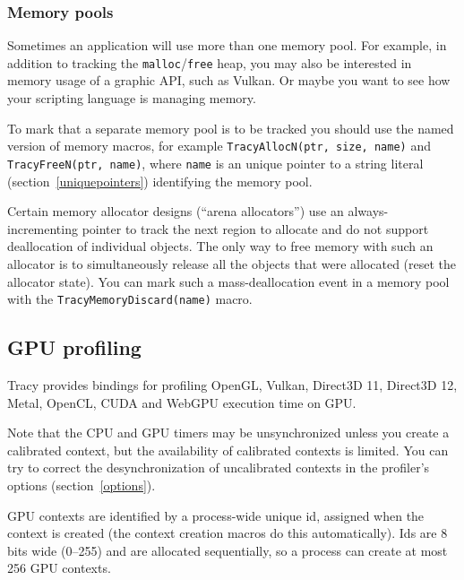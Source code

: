 \documentclass[hidelinks,titlepage,a4paper,twoside]{article}
\begin{document}
\subsubsection{Memory pools}
\label{memorypools}

Sometimes an application will use more than one memory pool. For example, in addition to tracking the \texttt{malloc}/\texttt{free} heap, you may also be interested in memory usage of a graphic API, such as Vulkan. Or maybe you want to see how your scripting language is managing memory.

To mark that a separate memory pool is to be tracked you should use the named version of memory macros, for example \texttt{TracyAllocN(ptr, size, name)} and \texttt{TracyFreeN(ptr, name)}, where \texttt{name} is an unique pointer to a string literal (section~\ref{uniquepointers}) identifying the memory pool.

Certain memory allocator designs (\enquote{arena allocators}) use an always-incrementing pointer to track the next region to allocate and do not support deallocation of individual objects. The only way to free memory with such an allocator is to simultaneously release all the objects that were allocated (reset the allocator state). You can mark such a mass-deallocation event in a memory pool with the \texttt{TracyMemoryDiscard(name)} macro.

\subsection{GPU profiling}
\label{gpuprofiling}

Tracy provides bindings for profiling OpenGL, Vulkan, Direct3D 11, Direct3D 12, Metal, OpenCL, CUDA and WebGPU execution time on GPU.

Note that the CPU and GPU timers may be unsynchronized unless you create a calibrated context, but the availability of calibrated contexts is limited. You can try to correct the desynchronization of uncalibrated contexts in the profiler's options (section~\ref{options}).

GPU contexts are identified by a process-wide unique id, assigned when the context is created (the context creation macros do this automatically). Ids are 8 bits wide (0--255) and are allocated sequentially, so a process can create at most 256 GPU contexts.
\end{document}
